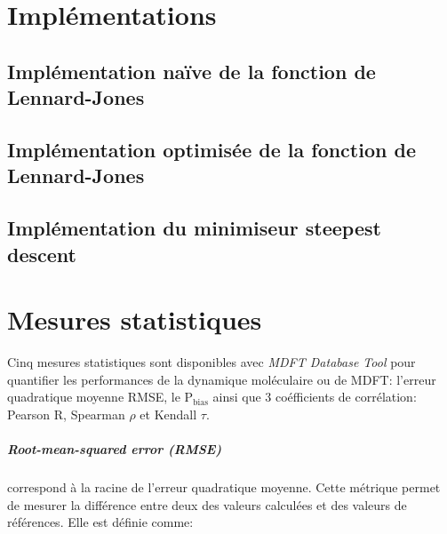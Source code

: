 \chapter{Implémentations}
\label{chap:annexes:implementations}

\cleardoublepage
\section{Implémentation naïve de la fonction de Lennard-Jones}
\label{sec:annexes:implementations:MJ_naive}


\cleardoublepage
\section{Implémentation optimisée de la fonction de Lennard-Jones}
\label{sec:annexes:implementations:MJ_opti}


\cleardoublepage
\section{Implémentation du minimiseur steepest descent}
\label{sec:annexes:implementations:sd}





\chapter{Mesures statistiques}
\label{chap:annexes:stats}

Cinq mesures statistiques sont disponibles avec \textit{MDFT Database Tool} pour quantifier les performances de la dynamique moléculaire ou de MDFT: l'erreur quadratique moyenne RMSE, le $\mathrm{P}_{\mathrm{bias}}$ ainsi que 3 coéfficients de corrélation: Pearson R, Spearman $\rho$ et Kendall $\tau$.

\paragraph{Root-mean-squared error (RMSE)} correspond à la racine de l'erreur quadratique moyenne. Cette métrique permet de mesurer la différence entre deux des valeurs calculées et des valeurs de références. Elle est définie comme:

